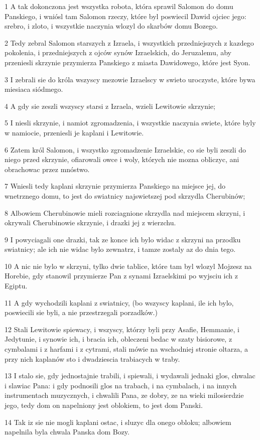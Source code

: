 \par 1 A tak dokonczona jest wszystka robota, która sprawil Salomon do domu Panskiego, i wniósl tam Salomon rzeczy, które byl poswiecil Dawid ojciec jego: srebro, i zloto, i wszystkie naczynia wlozyl do skarbów domu Bozego.
\par 2 Tedy zebral Salomon starszych z Izraela, i wszystkich przedniejszych z kazdego pokolenia, i przedniejszych z ojców synów Izraelskich, do Jeruzalemu, aby przeniesli skrzynie przymierza Panskiego z miasta Dawidowego, które jest Syon.
\par 3 I zebrali sie do króla wszyscy mezowie Izraelscy w swieto uroczyste, które bywa miesiaca siódmego.
\par 4 A gdy sie zeszli wszyscy starsi z Izraela, wzieli Lewitowie skrzynie;
\par 5 I niesli skrzynie, i namiot zgromadzenia, i wszystkie naczynia swiete, które byly w namiocie, przeniesli je kaplani i Lewitowie.
\par 6 Zatem król Salomon, i wszystko zgromadzenie Izraelskie, co sie byli zeszli do niego przed skrzynie, ofiarowali owce i woly, których nie mozna obliczyc, ani obrachowac przez mnóstwo.
\par 7 Wniesli tedy kaplani skrzynie przymierza Panskiego na miejsce jej, do wnetrznego domu, to jest do swiatnicy najswietszej pod skrzydla Cherubinów;
\par 8 Albowiem Cherubinowie mieli rozciagnione skrzydla nad miejscem skrzyni, i okrywali Cherubinowie skrzynie, i drazki jej z wierzchu.
\par 9 I powyciagali one drazki, tak ze konce ich bylo widac z skrzyni na przodku swiatnicy; ale ich nie widac bylo zewnatrz, i tamze zostaly az do dnia tego.
\par 10 A nic nie bylo w skrzyni, tylko dwie tablice, które tam byl wlozyl Mojzesz na Horebie, gdy stanowil przymierze Pan z synami Izraelskimi po wyjsciu ich z Egiptu.
\par 11 A gdy wychodzili kaplani z swiatnicy, (bo wszyscy kaplani, ile ich bylo, poswiecili sie byli, a nie przestrzegali porzadków.)
\par 12 Stali Lewitowie spiewacy, i wszyscy, którzy byli przy Asafie, Hemmanie, i Jedytunie, i synowie ich, i bracia ich, obleczeni bedac w szaty bisiorowe, z cymbalami i z harfami i z cytrami, stali mówie na wschodniej stronie oltarza, a przy nich kaplanów sto i dwadziescia trabiacych w traby.
\par 13 I stalo sie, gdy jednostajnie trabili, i spiewali, i wydawali jednaki glos, chwalac i slawiac Pana: i gdy podnosili glos na trabach, i na cymbalach, i na innych instrumentach muzycznych, i chwalili Pana, ze dobry, ze na wieki milosierdzie jego, tedy dom on napelniony jest oblokiem, to jest dom Panski.
\par 14 Tak iz sie nie mogli kaplani ostac, i sluzyc dla onego obloku; albowiem napelnila byla chwala Panska dom Bozy.

